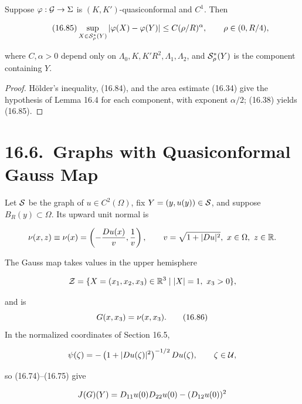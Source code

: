 \begin{theorem}\label{gilbarg-trudinger.thm.16.15.quasiconformal-holder}
Suppose $\varphi:\mathcal{G}\to\Sigma$ is $(K,K')$-quasiconformal and $C^1$. Then

\begin{equation}\tag{16.85}
\sup_{X\in \mathcal{S}_\rho^\ast(Y)} |\varphi(X)-\varphi(Y)|\leq C(\rho/R)^\alpha,\qquad \rho\in(0,R/4),
\end{equation}






where $C,\alpha>0$ depend only on $\Lambda_0,K,K'R^2,\Lambda_1,\Lambda_2$, and $\mathcal{S}_\rho^*(Y)$ is the component containing $Y$.
\end{theorem}
\begin{proof}
\sketch H\"older's inequality, (16.84), and the area estimate (16.34) give the hypothesis of Lemma 16.4 for each component, with exponent $\alpha/2$; (16.38) yields (16.85).
\end{proof}

\section*{16.6.\ Graphs with Quasiconformal Gauss Map}

Let $\mathcal{S}$ be the graph of $u\in C^2(\Omega)$, fix
$Y=(y,u(y))\in\mathcal{S}$, and suppose $B_R(y)\subset\Omega$.  Its upward unit
normal is

\[
\nu(x,z) \equiv \nu(x) = \left(-\frac{D u(x)}{v}, \frac{1}{v}\right), \qquad v = \sqrt{1+|D u|^2}, \ x \in \Omega, \ z \in \mathbb{R}.
\]

The Gauss map takes values in the upper hemisphere

\[
\mathcal{Z} = \{X=(x_1,x_2,x_3)\in \mathbb{R}^3 \mid |X|=1, \ x_3>0\},
\]

and is
\begin{equation}
G(x,x_3)=\nu(x,x_3).
\tag{16.86}
\end{equation}
In the normalized coordinates of Section 16.5,

\[
\psi(\zeta) = -\left(1 + |D u(\zeta)|^2\right)^{-1/2}D u(\zeta), \qquad \zeta \in \mathcal{U},
\]

so (16.74)--(16.75) give

\[
J(G)(Y)=D_{11}u(0)D_{22}u(0)-(D_{12}u(0))^2
\]




